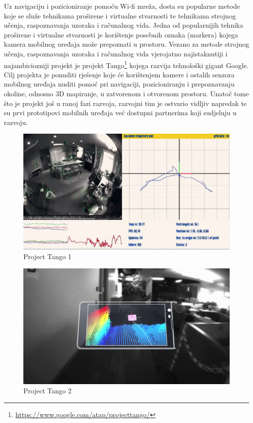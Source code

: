 Uz navigaciju i pozicioniranje pomoću Wi-fi mreža, dosta su popularne metode koje se služe tehnikama proširene i virtualne stvarnosti te tehnikama strojnog učenja, raspoznavanja uzoraka i računalnog vida. 
Jedna od popularnijih tehnika proširene i virtualne stvarnosti je korištenje posebnih oznaka (markera) kojega kamera mobilnog uređaja može prepoznati u prostoru. 
Vezano za metode strojnog učenja, raspoznavanja uzoraka i računalnog vida vjerojatno najistaknutiji i najambiciozniji projekt je projekt Tango\footnote{\url{https://www.google.com/atap/projecttango/}} kojega razvija tehnološki gigant Google. 
Cilj projekta je ponuditi rješenje koje će korištenjem kamere i ostalih senzora mobilnog uređaja nuditi pomoć pri navigaciji, pozicioniranju i prepoznavanju okoline, odnosno 3D mapiranje, u zatvorenom i otvorenom prostoru. 
Unatoč tome što je projekt još u ranoj fazi razvoja, razvojni tim je ostvario vidljiv napredak te su prvi prototipovi mobilnih uređaja već dostupni partnerima koji sudjeluju u razvoju.

\begin{figure}[H]
    \centering
    \includegraphics[scale=0.24]{pictures/tango1}
    \caption{Project Tango 1}
\end{figure}

\begin{figure}[H]
    \centering
    \includegraphics[scale=0.24]{pictures/tango2}
    \caption{Project Tango 2}
\end{figure}

